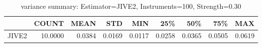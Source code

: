 \begin{table}[ht]
\centering
\caption{variance summary: Estimator=JIVE2, Instruments=100, Strength=0.30}
\begin{tabular}{lrrrrrrrr}
\toprule
 & COUNT & MEAN & STD & MIN & 25\% & 50\% & 75\% & MAX \\
\midrule
JIVE2 & 10.0000 & 0.0384 & 0.0169 & 0.0117 & 0.0258 & 0.0365 & 0.0505 & 0.0619 \\
\bottomrule
\end{tabular}
\end{table}
